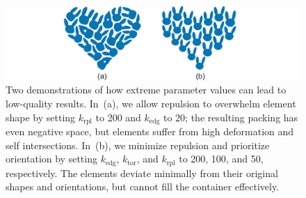 \begin{figure}
\centering
\includegraphics[width=1.0\textwidth]{figures/repulsionpak/bad_results.pdf} 
\vspace{-12pt}
\caption[Two demonstrations of how extreme parameter values can lead to \newline 
	low-quality results]
	{\label{bad_results}
Two demonstrations of how extreme parameter values can lead to
	low-quality results.  In~(a), we allow repulsion to overwhelm element
	shape by setting $k_\mathrm{rpl}$ to 200 and $k_\mathrm{edg}$ to 20; the resulting packing 
	has even negative space, but elements suffer from high deformation
	and self intersections.  In~(b), we minimize repulsion and prioritize
	orientation by setting $k_\mathrm{edg}$, $k_\mathrm{tor}$, and $k_\mathrm{rpl}$ to 200, 100, and 50,
	respectively.  The elements deviate minimally from their original shapes 
	and orientations, but cannot fill the container effectively.
}
\end{figure}

